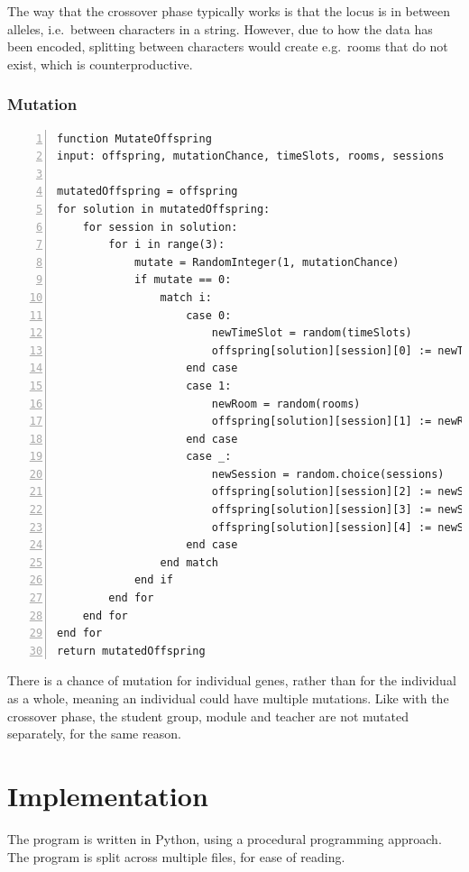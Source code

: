\documentclass[a4paper, 12pt]{report}
\begin{document}
The way that the crossover phase typically works is that the locus is in between
alleles, i.e.\ between characters in a string. 
However, due to how the data has been encoded, splitting between characters 
would create e.g.\ rooms that do not exist, which is counterproductive. 

\subsection{Mutation}

\begin{Verbatim}[numbers=left, fontsize=\footnotesize]
function MutateOffspring
input: offspring, mutationChance, timeSlots, rooms, sessions

mutatedOffspring = offspring
for solution in mutatedOffspring:
    for session in solution:
        for i in range(3):
            mutate = RandomInteger(1, mutationChance)
            if mutate == 0:
                match i:
                    case 0:
                        newTimeSlot = random(timeSlots)
                        offspring[solution][session][0] := newTimeSlot
                    end case
                    case 1:
                        newRoom = random(rooms)
                        offspring[solution][session][1] := newRoom
                    end case
                    case _:
                        newSession = random.choice(sessions)
                        offspring[solution][session][2] := newSession[0]
                        offspring[solution][session][3] := newSession[1]
                        offspring[solution][session][4] := newSession[2]
                    end case
                end match
            end if
        end for
    end for
end for
return mutatedOffspring
\end{Verbatim}

There is a chance of mutation for individual genes, rather than for the 
individual as a whole, meaning an individual could have multiple mutations.
Like with the crossover phase, the student group, module and teacher are not 
mutated separately, for the same reason.

\chapter{Implementation}

The program is written in Python, using a procedural programming approach.
The program is split across multiple files, for ease of reading.
\end{document}
